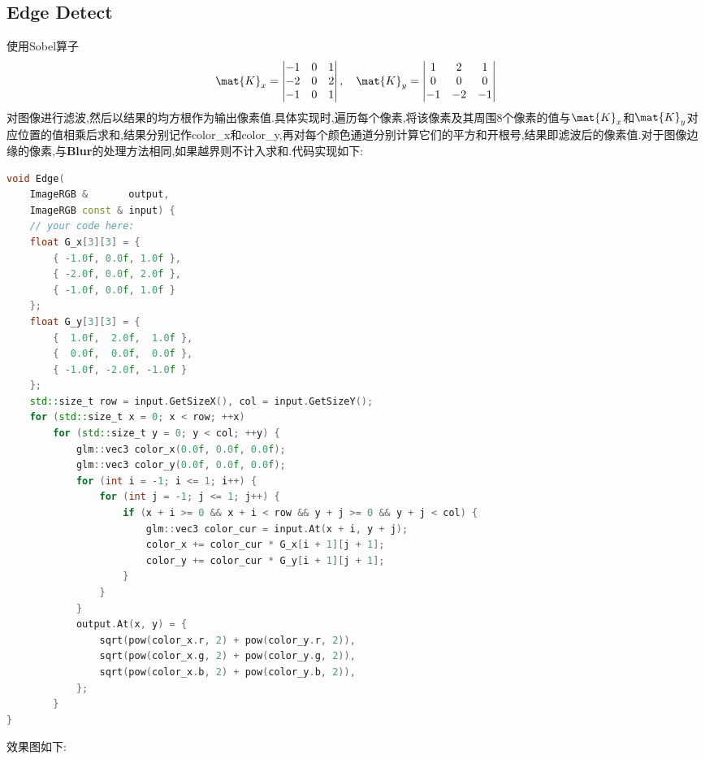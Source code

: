 \documentclass{ctexart}
\begin{document}
\subsection*{Edge Detect}
使用Sobel算子
\[\mat{K}_x=\begin{vmatrix}
    -1&0&1\\
    -2&0&2\\
    -1&0&1
\end{vmatrix},\quad\mat{K}_y=\begin{vmatrix}
    1&2&1\\
    0&0&0\\
    -1&-2&-1
\end{vmatrix}\]
对图像进行滤波,然后以结果的均方根作为输出像素值.具体实现时,遍历每个像素,将该像素及其周围8个像素的值与$\mat{K}_x$和$\mat{K}_y$对应位置的值相乘后求和,结果分别记作{\codefont color\_x}和{\codefont color\_y},再对每个颜色通道分别计算它们的平方和开根号,结果即滤波后的像素值.对于图像边缘的像素,与\textbf{Blur}的处理方法相同,如果越界则不计入求和.代码实现如下:
\begin{lstlisting}[language=C++]
void Edge(
    ImageRGB &       output,
    ImageRGB const & input) {
    // your code here:
    float G_x[3][3] = {
        { -1.0f, 0.0f, 1.0f },
        { -2.0f, 0.0f, 2.0f },
        { -1.0f, 0.0f, 1.0f }
    };
    float G_y[3][3] = {
        {  1.0f,  2.0f,  1.0f },
        {  0.0f,  0.0f,  0.0f },
        { -1.0f, -2.0f, -1.0f }
    };
    std::size_t row = input.GetSizeX(), col = input.GetSizeY();
    for (std::size_t x = 0; x < row; ++x)
        for (std::size_t y = 0; y < col; ++y) {
            glm::vec3 color_x(0.0f, 0.0f, 0.0f);
            glm::vec3 color_y(0.0f, 0.0f, 0.0f);
            for (int i = -1; i <= 1; i++) {
                for (int j = -1; j <= 1; j++) {
                    if (x + i >= 0 && x + i < row && y + j >= 0 && y + j < col) {
                        glm::vec3 color_cur = input.At(x + i, y + j);
                        color_x += color_cur * G_x[i + 1][j + 1];
                        color_y += color_cur * G_y[i + 1][j + 1];
                    }
                }
            }
            output.At(x, y) = {
                sqrt(pow(color_x.r, 2) + pow(color_y.r, 2)),
                sqrt(pow(color_x.g, 2) + pow(color_y.g, 2)),
                sqrt(pow(color_x.b, 2) + pow(color_y.b, 2)),
            };
        }
}
\end{lstlisting}
效果图如下:
\end{document}
